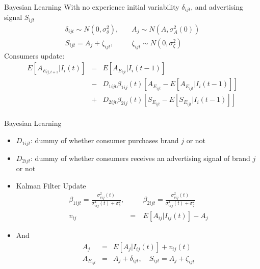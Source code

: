\documentclass[xcolor=pdftex,dvipsnames,table,mathserif]{beamer}
\begin{document}
\begin{frame}{Bayesian Learning}
With no experience initial variability $\delta_{ijt}$, and advertising signal $S_{ijt}$
\begin{eqnarray*}
\delta_{ijt} \sim N(0,\sigma_{\delta}^2),  \quad& A_j \sim N(A,\sigma_A^2(0))\\
S_{ijt} = A_j + \zeta_{ijt}, \quad &\zeta_{ijt} \sim N(0,\sigma_{\zeta}^2)
\end{eqnarray*}
Consumers update:
\begin{eqnarray*}
E[A_{E_{ij,t+1}} | I_i(t)] &=&  E[A_{E_{ijt}} | I_i(t-1)] \\
 &-& D_{1ijt} \beta_{1ij}(t) [A_{E_{ijt}} - E[A_{E_{ijt}} | I_i(t-1)] ] \\
 &+&D_{2ijt} \beta_{2ij}(t) [S_{E_{ijt}} - E[S_{E_{ijt}} | I_i(t-1)] ] \\
\end{eqnarray*}
\end{frame}

\begin{frame}{Bayesian Learning}
\begin{itemize}
\item $D_{1ijt}$: dummy of whether consumer purchases brand $j$ or not
\item $D_{2ijt}$: dummy of whether consumers receives an advertising signal of brand $j$ or not
\item Kalman Filter Update
\begin{eqnarray*}
\beta_{1ijt} = \frac{ \sigma_{vij}^2(t)} { \sigma_{vij}^2(t) + \sigma_{\delta}^2}, &\quad& 
\beta_{2ijt} = \frac{ \sigma_{vij}^2(t)} { \sigma_{vij}^2(t) + \sigma_{\zeta}^2}\\
v_{ij} &=& E[A_{ij} | I_{ij}(t)] - A_j
\end{eqnarray*} 
\item And
\begin{eqnarray*}
A_{j} &=& E[A_j | I_{ij}(t)] + v_{ij}(t)\\
A_{E_{ijt}} &=& A_j + \delta_{ijt} , \quad S_{ijt} = A_j + \zeta_{ijt}
\end{eqnarray*} 
\end{itemize}
\end{frame}
\end{document}
